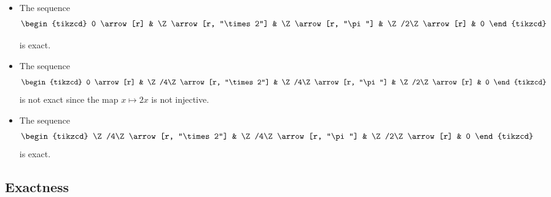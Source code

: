 \documentclass[main.tex]{subfiles}
\begin{document}
\begin{example}
  \leavevmode
  \begin{itemize}
    \item The sequence
      \begin{equation*}
        \begin{tikzcd}
          0
          \arrow[r]
          & \Z
          \arrow[r, "\times 2"]
          & \Z
          \arrow[r, "\pi"]
          & \Z/2\Z
          \arrow[r]
          & 0
        \end{tikzcd}
      \end{equation*}

      is exact.

    \item The sequence
      \begin{equation*}
        \begin{tikzcd}
          0
          \arrow[r]
          & \Z/4\Z
          \arrow[r, "\times 2"]
          & \Z/4\Z
          \arrow[r, "\pi"]
          & \Z/2\Z
          \arrow[r]
          & 0
        \end{tikzcd}
      \end{equation*}
      is not exact since the map $x \mapsto 2x$ is not injective.

    \item The sequence
      \begin{equation*}
        \begin{tikzcd}
          \Z/4\Z
          \arrow[r, "\times 2"]
          & \Z/4\Z
          \arrow[r, "\pi"]
          & \Z/2\Z
          \arrow[r]
          & 0
        \end{tikzcd}
      \end{equation*}
      is exact.
  \end{itemize}
\end{example}

\subsection{Exactness}
\label{sec:_exactness}
\end{document}
